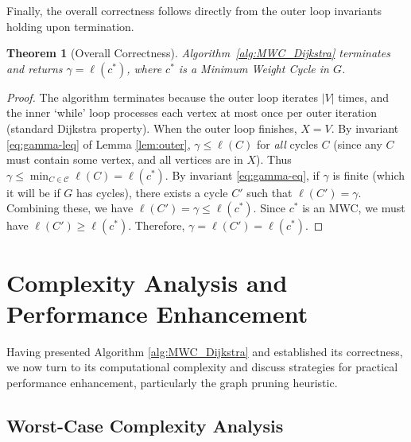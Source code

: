 \documentclass{article}
\newtheorem{theorem}{Theorem}
\begin{document}
Finally, the overall correctness follows directly from the outer loop invariants holding upon termination.

\begin{theorem}[Overall Correctness]
\label{thm:overall_correctness}
Algorithm~\ref{alg:MWC_Dijkstra} terminates and returns $\gamma = \ell(c^*)$, where $c^*$ is a Minimum Weight Cycle in $G$.
\end{theorem}
\begin{proof}
The algorithm terminates because the outer loop iterates $|V|$ times, and the inner `while' loop processes each vertex at most once per outer iteration (standard Dijkstra property). When the outer loop finishes, $X=V$. By invariant \eqref{eq:gamma-leq} of Lemma \ref{lem:outer}, $\gamma \leq \ell(C)$ for \textit{all} cycles $C$ (since any $C$ must contain some vertex, and all vertices are in $X$). Thus $\gamma \le \min_{C \in \mathscr{C}} \ell(C) = \ell(c^*)$. By invariant \eqref{eq:gamma-eq}, if $\gamma$ is finite (which it will be if $G$ has cycles), there exists a cycle $C'$ such that $\ell(C') = \gamma$. Combining these, we have $\ell(C') = \gamma \le \ell(c^*)$. Since $c^*$ is an MWC, we must have $\ell(C') \ge \ell(c^*)$. Therefore, $\gamma = \ell(C') = \ell(c^*)$.
\end{proof}







\section{Complexity Analysis and Performance Enhancement}
\label{sec:complexity} %

Having presented Algorithm \ref{alg:MWC_Dijkstra} and established its correctness, we now turn to its computational complexity and discuss strategies for practical performance enhancement, particularly the graph pruning heuristic.

\subsection{Worst-Case Complexity Analysis}
\label{subsec:worst_case}
\end{document}
